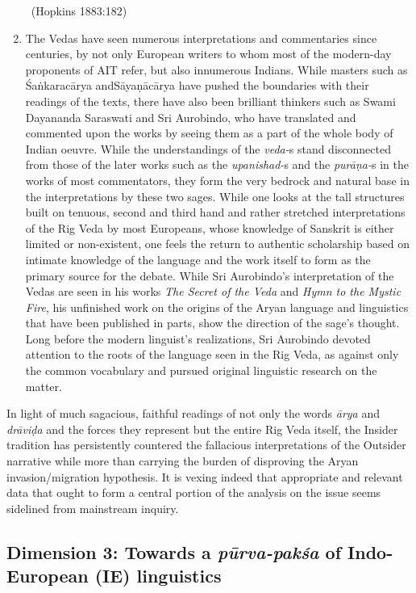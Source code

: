 \begin{enumerate}
\begin{myquote}
~\hfill (Hopkins 1883:182)
\end{myquote}


 \item The Vedas have seen numerous interpretations and commentaries since centuries, by not only European writers to whom most of the modern-day proponents of AIT refer, but also innumerous Indians. While masters such as Śaṅkaracārya and\break Sāyaṇācārya have pushed the boundaries with their readings of the texts, there have also been brilliant thinkers such as Swami Dayananda Saraswati and Sri Aurobindo, who have translated and commented upon the works by seeing them as a part of the whole body of Indian oeuvre. While the understandings of the \textit{veda-}s stand disconnected from those of the later works such as the \textit{upanishad-}s and the \textit{purāṇa-}s in the works of most commentators, they form the very bedrock and natural base in the interpretations by these two sages. While one looks at the tall structures built on tenuous, second and third hand and rather stretched interpretations of the Rig Veda by most Europeans, whose knowledge of Sanskrit is either limited or non-existent, one feels the return to authentic scholarship based on intimate knowledge of the language and the work itself to form as the primary source for the debate. While Sri Aurobindo’s interpretation of the Vedas are seen in his works \textit{The Secret of the Veda} and \textit{Hymn to the Mystic Fire}, his unfinished work on the origins of the Aryan language and linguistics that have been published in parts, show the direction of the sage’s thought. Long before the modern linguist’s realizations, Sri Aurobindo devoted attention to the roots of the language seen in the Rig Veda, as against only the common vocabulary and pursued original linguistic research on the matter.

\end{enumerate}

In light of much sagacious, faithful readings of not only the words \textit{ārya} and \textit{drāviḍa} and the forces they represent but the entire Rig Veda itself, the Insider tradition has persistently countered the fallacious interpretations of the Outsider narrative while more than carrying the burden of disproving the Aryan invasion/migration hypothesis. It is vexing indeed that appropriate and relevant data that ought to form a central portion of the analysis on the issue seems sidelined from mainstream inquiry.


\subsection{Dimension 3: Towards a \textit{pūrva-pakśa} of Indo-European (IE) linguistics}

